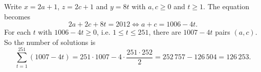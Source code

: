 Write $x=2a+1$, $z=2c+1$ and $y=8t$ with $a,c\ge0$ and $t\ge1$. The equation becomes
\[2a+2c+8t=2012\iff a+c=1006-4t .\]
For each $t$ with $1006-4t\ge0$, i.e. $1\le t\le251$, there are $1007-4t$ pairs $(a,c)$. So the number of solutions is
\[\sum_{t=1}^{251}(1007-4t)=251\cdot1007-4\cdot\dfrac{251\cdot252}{2}=252\,757-126\,504=\boxed{126\,253}.\]
